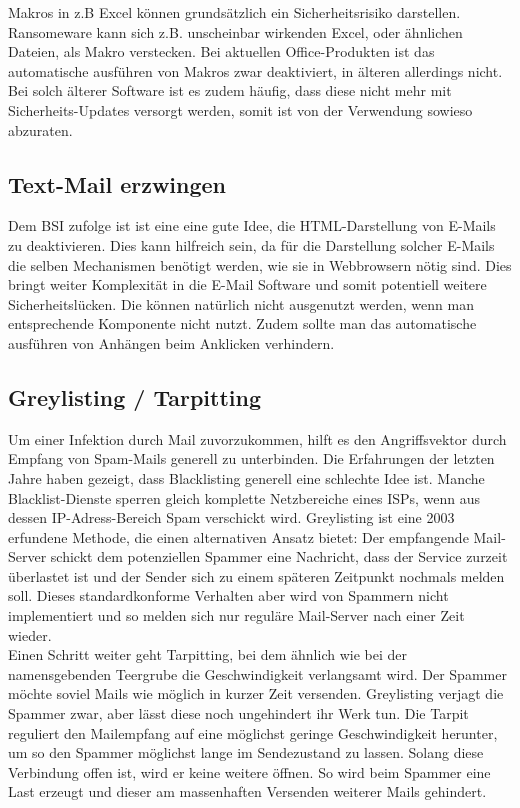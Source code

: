 	Makros in z.B Excel können grundsätzlich ein Sicherheitsrisiko darstellen. Ransomeware kann sich z.B. unscheinbar wirkenden Excel, oder ähnlichen Dateien, als Makro verstecken. Bei aktuellen Office-Produkten ist das automatische ausführen von Makros zwar deaktiviert, in älteren allerdings nicht. Bei solch älterer Software ist es zudem häufig, dass diese nicht mehr mit Sicherheits-Updates versorgt werden, somit ist von der Verwendung sowieso abzuraten. 
	
\subsection{Text-Mail erzwingen}

	Dem BSI zufolge ist ist eine eine gute Idee, die HTML-Darstellung von E-Mails zu deaktivieren. Dies kann hilfreich sein, da für die Darstellung solcher E-Mails die selben Mechanismen benötigt werden, wie sie in Webbrowsern nötig sind. Dies bringt weiter Komplexität in die E-Mail Software und somit potentiell weitere Sicherheitslücken. Die können natürlich nicht ausgenutzt werden, wenn man entsprechende Komponente nicht nutzt. Zudem sollte man das automatische ausführen von Anhängen beim Anklicken verhindern\cite{bsi:ransome}.
	
	
\subsection{Greylisting / Tarpitting}
	
	Um einer Infektion durch Mail zuvorzukommen, hilft es den Angriffsvektor durch Empfang von Spam-Mails generell zu unterbinden. Die Erfahrungen der letzten Jahre haben gezeigt, dass Blacklisting generell eine schlechte Idee ist. Manche Blacklist-Dienste sperren gleich komplette Netzbereiche eines ISPs, wenn aus dessen IP-Adress-Bereich Spam verschickt wird. Greylisting ist eine 2003 erfundene Methode, die einen alternativen Ansatz bietet: Der empfangende Mail-Server schickt dem potenziellen Spammer eine Nachricht, dass der Service zurzeit überlastet ist und der Sender sich zu einem späteren Zeitpunkt nochmals melden soll. Dieses standardkonforme Verhalten aber wird von Spammern nicht implementiert und so melden sich nur reguläre Mail-Server nach einer Zeit wieder\cite{greylisting}. \\
	Einen Schritt weiter geht \glqq Tarpitting\grqq, bei dem ähnlich wie bei der namensgebenden Teergrube die Geschwindigkeit verlangsamt wird. Der Spammer möchte soviel Mails wie möglich in kurzer Zeit versenden. Greylisting verjagt die Spammer zwar, aber lässt diese noch ungehindert ihr Werk tun. Die Tarpit reguliert den Mailempfang auf eine möglichst geringe Geschwindigkeit herunter, um so den Spammer möglichst lange im Sendezustand zu lassen. Solang diese Verbindung offen ist, wird er keine weitere öffnen. So wird beim Spammer eine Last erzeugt und dieser am massenhaften Versenden weiterer Mails gehindert.
	

